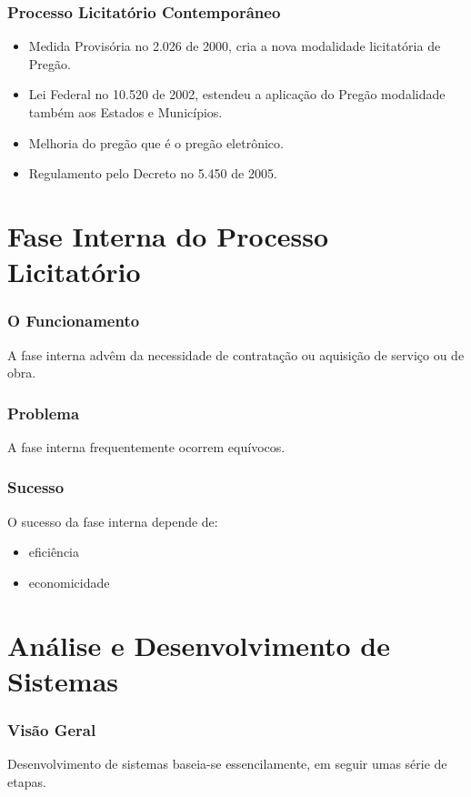 \documentclass{beamer}
\begin{document}
		\begin{frame}\frametitle{Processo Licitatório Contemporâneo}
			\begin{itemize}
				\item Medida Provisória no 2.026 de 2000, cria a nova modalidade licitatória de Pregão.
				\item Lei Federal no 10.520 de 2002, estendeu a aplicação do Pregão modalidade também aos Estados e Municípios.
				\item Melhoria do pregão que é o pregão eletrônico.
				\item Regulamento pelo Decreto no 5.450 de 2005.
			\end{itemize}
		\end{frame}
		
	\section{Fase Interna do Processo Licitatório}
		\begin{frame}\frametitle{O Funcionamento}
			A fase interna advêm da necessidade de contratação ou aquisição de serviço ou de obra.
		\end{frame}
	
		\begin{frame}\frametitle{Problema}
			A fase interna frequentemente ocorrem equívocos.
		\end{frame}
		
		\begin{frame}\frametitle{Sucesso}
			O sucesso da fase interna depende de:
			\begin{itemize}
				\item eficiência
				\item economicidade
			\end{itemize}
	    \end{frame}

	\section{Análise e Desenvolvimento de Sistemas}
	
	\begin{frame}\frametitle{Visão Geral}
		Desenvolvimento de sistemas baseia-se essencilamente, em seguir umas série de etapas.
	\end{frame}
	
\end{document}
